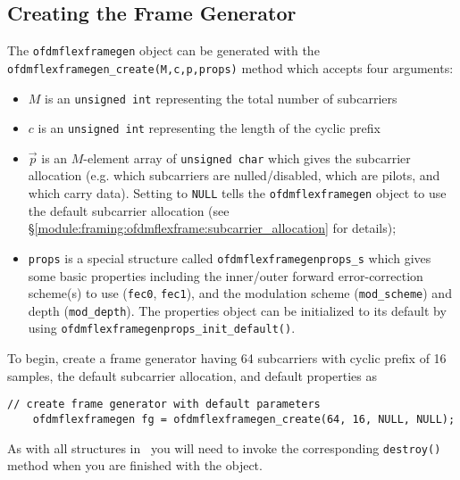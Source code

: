 \subsection{Creating the Frame Generator}
\label{tutorial:ofdmflexframe:framegen}
%
The {\tt ofdmflexframegen} object can be generated with the
{\tt ofdmflexframegen\_create(M,c,p,props)} method which accepts four arguments:
%
\begin{itemize}
\item $M$ is an {\tt unsigned int} representing the total number of
    subcarriers
\item $c$ is an {\tt unsigned int} representing the length of the
    cyclic prefix
\item $\vec{p}$ is an $M$-element array of {\tt unsigned char} which
    gives the subcarrier allocation (e.g. which subcarriers
    are nulled/disabled, which are pilots, and which carry data).
    Setting to {\tt NULL} tells the {\tt ofdmflexframegen} object to use
    the default subcarrier allocation
    (see \S\ref{module:framing:ofdmflexframe:subcarrier_allocation} for
    details);
\item {\tt props} is a special structure called
    {\tt ofdmflexframegenprops\_s}
    which gives some basic properties including
    the inner/outer forward error-correction scheme(s) to use
    ({\tt fec0}, {\tt fec1}),
    and the modulation scheme ({\tt mod\_scheme}) and depth
    ({\tt mod\_depth}).
    The properties object can be initialized to its default by using
    {\tt ofdmflexframegenprops\_init\_default()}.
\end{itemize}
%
To begin, create a frame generator having 64 subcarriers with cyclic
prefix of 16 samples, the default subcarrier allocation, and
default properties as
%
\begin{Verbatim}[fontsize=\small]
    // create frame generator with default parameters
    ofdmflexframegen fg = ofdmflexframegen_create(64, 16, NULL, NULL);
\end{Verbatim}
%
As with all structures in \liquid\ you will need to invoke the
corresponding {\tt destroy()} method when you are finished with the
object.

